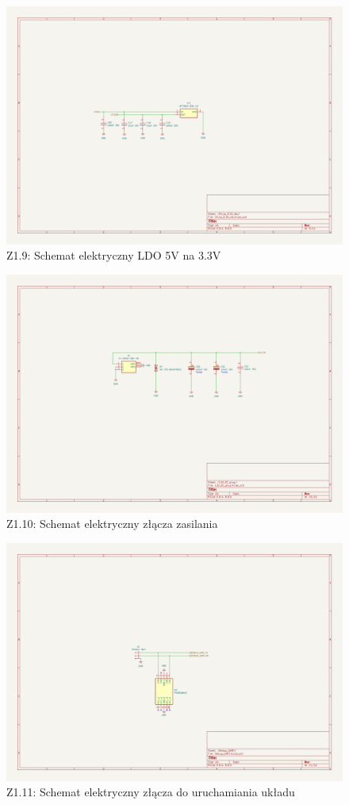 \documentclass[twoside]{article}
\numberwithin{equation}{section}
\begin{document}
\newpage
\thispagestyle{empty}
\begin{figure}[H]
    \centering
    \includegraphics[width=1.5\textwidth, angle=90]{zalaczniki/9.png}
    \caption*{Z1.9: Schemat elektryczny LDO 5V na 3.3V}
\end{figure}

\newpage
\thispagestyle{empty}
\begin{figure}[H]
    \centering
    \includegraphics[width=1.5\textwidth, angle=90]{zalaczniki/10.png}
    \caption*{Z1.10: Schemat elektryczny złącza zasilania}
\end{figure}

\newpage    
\thispagestyle{empty}
\begin{figure}[H]
    \centering
    \includegraphics[width=1.5\textwidth, angle=90]{zalaczniki/11.png}
    \caption*{Z1.11: Schemat elektryczny złącza do uruchamiania układu}
\end{figure}
\end{document}
